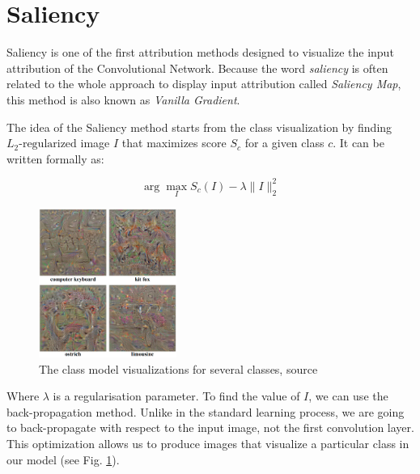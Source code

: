 \section{Saliency}\label{section:saliency}

Saliency \cite{simonyan2014deep} is one of the first attribution methods designed to visualize the input attribution of the Convolutional Network. Because the word \textit{saliency} is often related to the whole approach to display input attribution called \textit{Saliency Map}, this method is also known as \textit{Vanilla Gradient}.

\vspace{\baselineskip}

The idea of the Saliency method starts from the class visualization by finding $L_2\text{-regularized}$ image $I$ that maximizes score $S_c$ for a given class $c$. It can be written formally as:

\begin{equation}
\arg \max _{I} S_{c}(I)-\lambda\|I\|_{2}^{2}
\label{eq:saliency-image-maximization}
\end{equation}

\begin{figure}
  \setlength{\belowcaptionskip}{-12pt}
  \includegraphics[width=0.40\textwidth]{methods/images/saliency-class-image-visualization.png}
  \caption{The class model visualizations for several classes, source \cite{simonyan2014deep}}\label{fig:saliency-class-image-visualization}
\end{figure}

Where $\lambda$ is a regularisation parameter. To find the value of $I$, we can use the back-propagation method. Unlike in the standard learning process, we are going to back-propagate with respect to the input image, not the first convolution layer. This optimization allows us to produce images that visualize a particular class in our model (see Fig. \ref{fig:saliency-class-image-visualization}).

